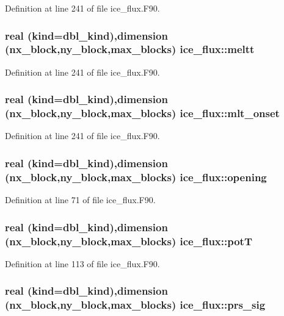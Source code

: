 Definition at line 241 of file ice\_\-flux.F90.\hypertarget{namespaceice__flux_aa99daffd05f84f37a6036ce5901100af}{
\subsubsection[{meltt}]{\setlength{\rightskip}{0pt plus 5cm}real (kind=dbl\_\-kind),dimension (nx\_\-block,ny\_\-block,max\_\-blocks) {\bf ice\_\-flux::meltt}}}
\label{namespaceice__flux_aa99daffd05f84f37a6036ce5901100af}


Definition at line 241 of file ice\_\-flux.F90.\hypertarget{namespaceice__flux_a9f86616260452938fcc37213fcb284f8}{
\subsubsection[{mlt\_\-onset}]{\setlength{\rightskip}{0pt plus 5cm}real (kind=dbl\_\-kind),dimension (nx\_\-block,ny\_\-block,max\_\-blocks) {\bf ice\_\-flux::mlt\_\-onset}}}
\label{namespaceice__flux_a9f86616260452938fcc37213fcb284f8}


Definition at line 241 of file ice\_\-flux.F90.\hypertarget{namespaceice__flux_ae0a39366aa114290bad9340508d55fd7}{
\subsubsection[{opening}]{\setlength{\rightskip}{0pt plus 5cm}real (kind=dbl\_\-kind),dimension (nx\_\-block,ny\_\-block,max\_\-blocks) {\bf ice\_\-flux::opening}}}
\label{namespaceice__flux_ae0a39366aa114290bad9340508d55fd7}


Definition at line 71 of file ice\_\-flux.F90.\hypertarget{namespaceice__flux_a81beec3343cd05b99ad439d5586d6156}{
\subsubsection[{potT}]{\setlength{\rightskip}{0pt plus 5cm}real (kind=dbl\_\-kind),dimension (nx\_\-block,ny\_\-block,max\_\-blocks) {\bf ice\_\-flux::potT}}}
\label{namespaceice__flux_a81beec3343cd05b99ad439d5586d6156}


Definition at line 113 of file ice\_\-flux.F90.\hypertarget{namespaceice__flux_a4406d054e8437ab55dc01d6e5b9c8882}{
\subsubsection[{prs\_\-sig}]{\setlength{\rightskip}{0pt plus 5cm}real (kind=dbl\_\-kind),dimension (nx\_\-block,ny\_\-block,max\_\-blocks) {\bf ice\_\-flux::prs\_\-sig}}}
\label{namespaceice__flux_a4406d054e8437ab55dc01d6e5b9c8882}


